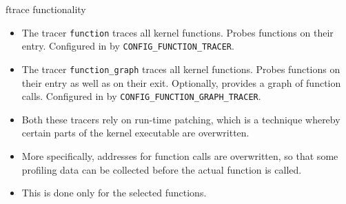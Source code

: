 \documentclass{beamer}
\begin{document}
\begin{frame}{ftrace functionality}
  \begin{itemize}
  \item The tracer \texttt{function} traces all kernel
    functions. Probes functions on their entry. Configured in by
    \texttt{CONFIG\_FUNCTION\_TRACER}.
  \item The tracer \texttt{function\_graph} traces all kernel
    functions. Probes functions on their entry as well as on their
    exit. Optionally, provides a graph of function calls. Configured
    in by \texttt{CONFIG\_FUNCTION\_GRAPH\_TRACER}.
  \item Both these tracers rely on run-time patching, which is a
    technique whereby certain parts of the kernel executable are
    overwritten.
  \item More specifically, addresses for function calls are
    overwritten, so that some profiling data can be collected before
    the actual function is called. 
  \item This is done only for the selected functions.
  \end{itemize}
\end{frame}
\end{document}
